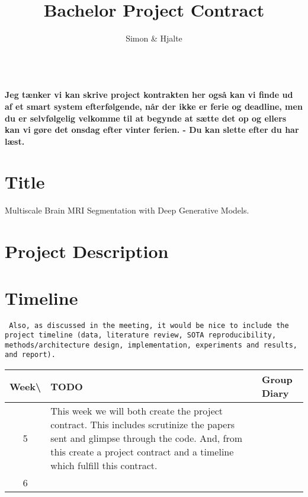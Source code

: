 \documentclass[a4paper,12pt]{article}
\begin{document}
\title{Bachelor Project Contract}
\author{\color{red}Simon \& Hjalte}
\date{}
\maketitle

\ls\\\textbf{Jeg tænker vi kan skrive project kontrakten her også kan vi finde ud af et smart system efterfølgende, når der ikke er ferie og deadline, men du er selvfølgelig velkomme til at begynde at sætte det op og ellers kan vi gøre det onsdag efter vinter ferien. - Du kan slette efter du har læst.}\ls
\section*{Title}
{\Large Multiscale Brain MRI Segmentation with Deep Generative Models.}


\section*{Project Description}







\section{Timeline}
\texttt{
Also, as discussed in the meeting, it would be nice to include the project timeline (data, literature review, SOTA reproducibility, methods/architecture design, implementation, experiments and results, and report).
}
\vspace{1em}

\def\arraystretch{1.2} %
\noindent\begin{tabular}{|c|p{11cm}|p{4cm}|}\hline
Week\textbackslash & TODO & Group Diary \\\hline\hline
5 & This week we will both create the project contract. This includes scrutinize the papers sent and glimpse through the code. And, from this create a project contract and a timeline which fulfill this contract. &  \\\hline
6 &  &  \\\hline
\end{tabular}
\vspace{1em}
\end{document}
